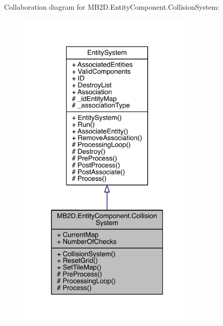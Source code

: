 Collaboration diagram for M\+B2\+D.\+Entity\+Component.\+Collision\+System\+:
\nopagebreak
\begin{figure}[H]
\begin{center}
\leavevmode
\includegraphics[width=244pt]{class_m_b2_d_1_1_entity_component_1_1_collision_system__coll__graph}
\end{center}
\end{figure}
